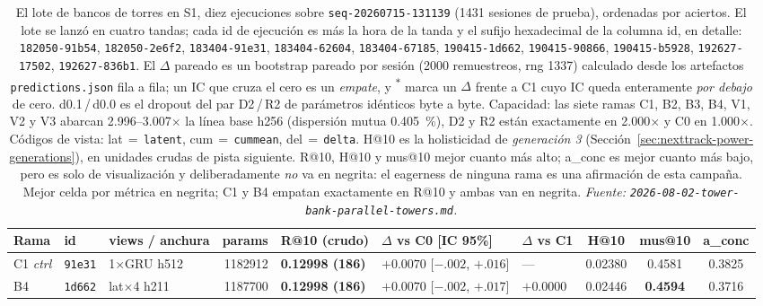 \documentclass[11pt]{article}
\newcommand{\runid}[1]{\texttt{\small\seqsplit{#1}}}
\newcommand{\dsid}[1]{\texttt{\small #1}}
\newcommand{\best}[1]{\textbf{#1}}
\begin{document}
\begin{table}[ht]
  \centering
  \caption{El lote de bancos de torres en S1, diez ejecuciones sobre
  \dsid{seq-20260715-131139} (\num{1431} sesiones de prueba), ordenadas por
  aciertos. El lote se lanzó en cuatro tandas; cada id de ejecución es
  \protect\runid{run-20260802-} más la hora de la tanda y el sufijo hexadecimal de
  la columna id, en detalle: \texttt{182050-91b54}, \texttt{182050-2e6f2},
  \texttt{183404-91e31}, \texttt{183404-62604}, \texttt{183404-67185},
  \texttt{190415-1d662}, \texttt{190415-90866}, \texttt{190415-b5928},
  \texttt{192627-17502}, \texttt{192627-836b1}. El $\Delta$ pareado es un bootstrap
  pareado por sesión (\num{2000} remuestreos, rng \num{1337}) calculado desde los
  artefactos \texttt{predictions.json} fila a fila; un IC que cruza el cero es un
  \emph{empate}, y \textsuperscript{$\ast$} marca un $\Delta$ frente a C1 cuyo IC
  queda enteramente \emph{por debajo} de cero. d\num{0.1}\,/\,d\num{0.0} es el
  dropout del par D2\,/\,R2 de parámetros idénticos byte a byte. Capacidad: las
  siete ramas C1, B2, B3, B4, V1, V2 y V3 abarcan
  \numrange{2.996}{3.007}$\times$ la línea base h256 (dispersión mutua
  \SI{0.405}{\percent}), D2 y R2 están exactamente en \num{2.000}$\times$ y C0 en
  \num{1.000}$\times$. Códigos de vista: lat\,$=$\,\texttt{latent},
  cum\,$=$\,\texttt{cummean}, del\,$=$\,\texttt{delta}. H@10 es la holisticidad de
  \emph{generación 3} (Sección~\ref{sec:nexttrack-power-generations}), en unidades crudas de
  pista siguiente. R@10, H@10 y mus@10 mejor cuanto más alto; a\_conc es mejor
  cuanto más bajo, pero es solo de visualización y deliberadamente \emph{no} va en
  negrita: el eagerness de ninguna rama es una afirmación de esta campaña. Mejor
  celda por métrica en negrita; C1 y B4 empatan exactamente en R@10 y ambas van en
  negrita.
  \emph{Fuente: \texttt{2026-08-02-tower-bank-parallel-towers.md}.}}
  \label{tab:nexttrack-towerbank-s1}
  {\scriptsize\setlength{\tabcolsep}{1.9pt}\begin{tabular}{lllrlllccc}
    \toprule
    Rama & id & views / anchura & params & R@10 (crudo) & $\Delta$ vs C0 [IC 95\%] & $\Delta$ vs C1 & H@10 & mus@10 & a\_conc \\
    \midrule
    C1 \emph{ctrl} & \texttt{91e31} & 1$\times$GRU h512 & \num{1182912} & \best{0.12998 (186)} & $+0.0070$ [$-.002$, $+.016$] & --- & 0.02380 & 0.4581 & 0.3825 \\
    B4 & \texttt{1d662} & lat$\times$4 h211 & \num{1187700} & \best{0.12998 (186)} & $+0.0070$ [$-.002$, $+.017$] & $+0.0000$ & 0.02446 & \best{0.4594} & 0.3716 \\

\end{tabular}}
\end{table}
\end{document}
